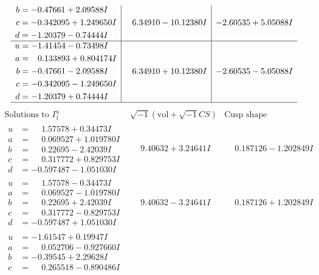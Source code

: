 \documentclass[1p]{elsarticle_modified}
\theoremstyle{definition}
\newcommand{\I}{\sqrt{-1}}
\begin{document}
$$\begin{array}{c|c|c}
\begin{aligned}
b &= -0.47661 + 2.09588 I \\
c &= -0.342095 + 1.249650 I \\
d &= -1.20379 - 0.74444 I\end{aligned}
 & \phantom{-}6.34910 - 10.12380 I & -2.60535 + 5.05088 I \\ \hline\begin{aligned}
u &= -1.41454 - 0.73498 I \\
a &= \phantom{-}0.133893 + 0.804174 I \\
b &= -0.47661 - 2.09588 I \\
c &= -0.342095 - 1.249650 I \\
d &= -1.20379 + 0.74444 I\end{aligned}
 & \phantom{-}6.34910 + 10.12380 I & -2.60535 - 5.05088 I\\
 \hline 
 \end{array}$$\newpage$$\begin{array}{c|c|c}  
\text{Solutions to }I^u_{1}& \I (\text{vol} + \sqrt{-1}CS) & \text{Cusp shape}\\
 \hline 
\begin{aligned}
u &= \phantom{-}1.57578 + 0.34473 I \\
a &= \phantom{-}0.069527 + 1.019780 I \\
b &= \phantom{-}0.22695 - 2.42039 I \\
c &= \phantom{-}0.317772 + 0.829753 I \\
d &= -0.597487 - 1.051030 I\end{aligned}
 & \phantom{-}9.40632 + 3.24641 I & \phantom{-}0.187126 - 1.202849 I \\ \hline\begin{aligned}
u &= \phantom{-}1.57578 - 0.34473 I \\
a &= \phantom{-}0.069527 - 1.019780 I \\
b &= \phantom{-}0.22695 + 2.42039 I \\
c &= \phantom{-}0.317772 - 0.829753 I \\
d &= -0.597487 + 1.051030 I\end{aligned}
 & \phantom{-}9.40632 - 3.24641 I & \phantom{-}0.187126 + 1.202849 I \\ \hline\begin{aligned}
u &= -1.61547 + 0.19947 I \\
a &= \phantom{-}0.052706 - 0.927660 I \\
b &= -0.39545 + 2.29628 I \\
c &= \phantom{-}0.265518 - 0.890486 I \\

\end{aligned}
\end{array}$$
\end{document}

